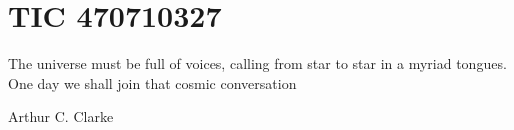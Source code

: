 \chapter{TIC 470710327}

\epigraph{The universe must be full of voices, calling from star to star in a myriad tongues. One day we shall join that cosmic conversation}{Arthur C. Clarke}